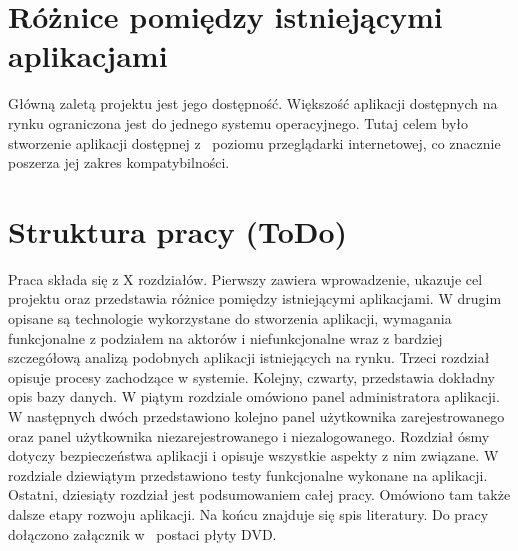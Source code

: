 \noindent
\section{Różnice pomiędzy istniejącymi aplikacjami}

Główną zaletą projektu jest jego dostępność. Większość aplikacji dostępnych na rynku ograniczona jest do jednego systemu operacyjnego. Tutaj celem było stworzenie aplikacji dostępnej z~ poziomu przeglądarki internetowej, co znacznie poszerza jej zakres kompatybilności. 


\section{Struktura pracy (ToDo)}

Praca składa się z X rozdziałów. Pierwszy zawiera wprowadzenie, ukazuje cel projektu oraz przedstawia różnice pomiędzy istniejącymi aplikacjami. W drugim opisane są technologie wykorzystane do stworzenia aplikacji, wymagania funkcjonalne z podziałem na aktorów i niefunkcjonalne wraz z bardziej szczegółową analizą podobnych aplikacji istniejących na rynku. Trzeci rozdział opisuje procesy zachodzące w systemie. Kolejny, czwarty, przedstawia dokładny opis bazy danych. W piątym rozdziale omówiono panel administratora aplikacji. W następnych dwóch przedstawiono kolejno panel użytkownika zarejestrowanego oraz panel użytkownika niezarejestrowanego i niezalogowanego. Rozdział ósmy dotyczy bezpieczeństwa aplikacji i opisuje wszystkie aspekty z nim związane. W~ rozdziale dziewiątym przedstawiono testy funkcjonalne wykonane na aplikacji. Ostatni, dziesiąty rozdział jest podsumowaniem całej pracy. Omówiono tam także dalsze etapy rozwoju aplikacji. Na końcu znajduje się spis literatury. Do pracy dołączono załącznik w~ postaci płyty DVD. 


